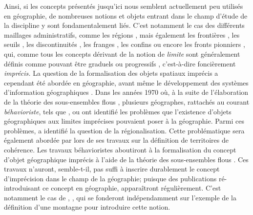 Ainsi, si les concepts présentés jusqu’ici nous semblent actuellement
peu utilisés en géographie, de nombreuses notions et objets entrant
dans le champ d’étude de la discipline y sont fondamentalement
liés. C’est notamment le cas des différents maillages administratifs,
comme les régions \autocite{Brennetot2014}, mais également les
frontières \autocite{Brunet1992}, les seuils
\autocite{Brunet1992,Levy2013}, les discontinuités
\autocite{Brunet1992,Brunet1997}, les franges \autocite{Brunet1992},
les confins \autocite{Brunet1997} ou encore les fronts pionniers
\autocite{Brunet1992}, qui, comme tous les concepts dérivant de la
notion de \emph{limite} sont généralement définis comme pouvant être
graduels ou progressifs \autocite{Brunet1992,Levy2013}, c’est-à-dire
foncièrement \emph{imprécis.} La question de la formalisation des
objets spatiaux imprécis a cependant été abordée en géographie, avant
même le développement des systèmes d’information géographiques
\autocite{Robinson2003}. Dans les années 1970 où, à la suite de
l’élaboration de la théorie des sous-ensembles flous
\autocite{Zadeh1965}, plusieurs géographes, rattachés au courant
\emph{béhavioriste}, tels que \textcite{Gale1972,Gale1976},
\textcite{Pipkin1978} ou \textcite{Leung1979, Leung1987} ont identifié
les problèmes que l’existence d’objets géographiques aux limites
imprécises pouvaient poser à la géographie. Parmi ces problèmes,
\textcite{Gale1976} a identifié la question de la
régionalisation. Cette problématique sera également abordée par
\textcite{Rolland-May1996,Rolland-May1999} lors de ses travaux sur la
définition de territoires de cohérence. Les travaux béhavioristes
aboutiront à la formalisation du concept d’objet géographique imprécis
à l’aide de la théorie des sous-ensembles flous
\autocite{Leung1987}. Ces travaux n’auront, semble-t-il, pas suffi à
inscrire durablement le concept d’imprécision dans le champ de la
géographie; puisque des publications ré-introduisant ce concept en
géographie, apparaîtront régulièrement. C’est notamment le cas de
\textcite{Fisher1998}, \textcite{Collins2000}, qui se fonderont
indépendamment sur l’exemple de la définition d’une montagne pour
introduire cette notion.


